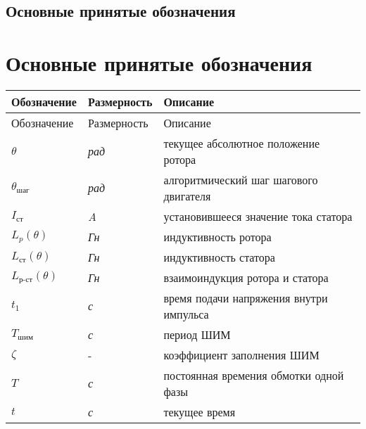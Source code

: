 \newpage
\ifdefined\DIPLOMA
    \subsection{Основные принятые обозначения}
\else
    \section{Основные принятые обозначения}
\fi


\begin{longtabu}{X[-1,r]X[-1,l]X[l]}
    Обозначение & Размерность & Описание \\ \hline
    \endfirsthead
    Обозначение & Размерность & Описание \\ \hline
    \endhead

    $\theta$                        & \textit{рад}  & текущее абсолютное положение ротора \\

    $\theta_{\textit{шаг}}$         & \textit{рад}  & алгоритмический шаг шагового двигателя \\

    $I_{\textit{ст}}$               & \textit{A}    & установившееся значение тока статора \\

    $L_{p}(\theta)$                 & \textit{Гн}   & индуктивность ротора \\

    $L_{\textit{ст}}(\theta)$       & \textit{Гн}   & индуктивность статора \\

    $L_{\textit{р-ст}}(\theta)$     & \textit{Гн}   & взаимоиндукция ротора и статора \\

    $t_{1}$                         & \textit{с}    & время подачи напряжения внутри импульса \\

    $T_\textit{шим}$                & \textit{с}    & период ШИМ \\

    $\zeta$                         & -             & коэффициент заполнения ШИМ \\

    $T$                             & \textit{с}    & постоянная времения обмотки одной фазы \\

    $t$                             & \textit{с}    & текущее время \\


\end{longtabu}
